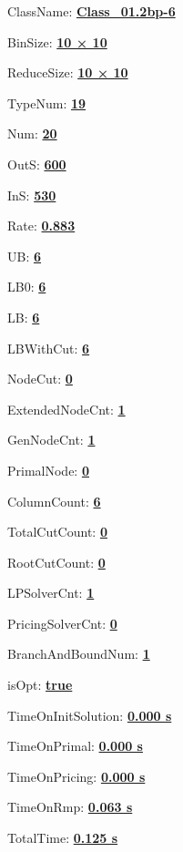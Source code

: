 \documentclass[11pt]{article}
\begin{document}
\pagestyle{empty}


ClassName: \underline{\textbf{Class_01.2bp-6}}
\par
BinSize: \underline{\textbf{10 × 10}}
\par
ReduceSize: \underline{\textbf{10 × 10}}
\par
TypeNum: \underline{\textbf{19}}
\par
Num: \underline{\textbf{20}}
\par
OutS: \underline{\textbf{600}}
\par
InS: \underline{\textbf{530}}
\par
Rate: \underline{\textbf{0.883}}
\par
UB: \underline{\textbf{6}}
\par
LB0: \underline{\textbf{6}}
\par
LB: \underline{\textbf{6}}
\par
LBWithCut: \underline{\textbf{6}}
\par
NodeCut: \underline{\textbf{0}}
\par
ExtendedNodeCnt: \underline{\textbf{1}}
\par
GenNodeCnt: \underline{\textbf{1}}
\par
PrimalNode: \underline{\textbf{0}}
\par
ColumnCount: \underline{\textbf{6}}
\par
TotalCutCount: \underline{\textbf{0}}
\par
RootCutCount: \underline{\textbf{0}}
\par
LPSolverCnt: \underline{\textbf{1}}
\par
PricingSolverCnt: \underline{\textbf{0}}
\par
BranchAndBoundNum: \underline{\textbf{1}}
\par
isOpt: \underline{\textbf{true}}
\par
TimeOnInitSolution: \underline{\textbf{0.000 s}}
\par
TimeOnPrimal: \underline{\textbf{0.000 s}}
\par
TimeOnPricing: \underline{\textbf{0.000 s}}
\par
TimeOnRmp: \underline{\textbf{0.063 s}}
\par
TotalTime: \underline{\textbf{0.125 s}}
\par
\newpage


\end{document}
